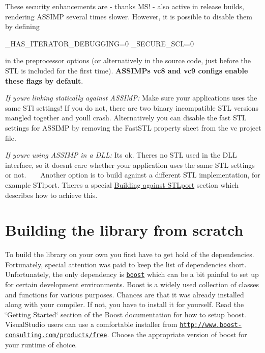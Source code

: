 These security enhancements are -\/ thanks M\+S! -\/ also active in release builds, rendering A\+S\+S\+I\+M\+P several times slower. However, it is possible to disable them by defining


\begin{DoxyCode}
\_HAS\_ITERATOR\_DEBUGGING=0
\_SECURE\_SCL=0
\end{DoxyCode}


in the preprocessor options (or alternatively in the source code, just before the S\+T\+L is included for the first time). {\bfseries A\+S\+S\+I\+M\+P\textquotesingle{}s vc8 and vc9 configs enable these flags by default}.

{\itshape If you\textquotesingle{}re linking statically against A\+S\+S\+I\+M\+P\+:} Make sure your applications uses the same S\+Tl settings! If you do not, there are two binary incompatible S\+T\+L versions mangled together and you\textquotesingle{}ll crash. Alternatively you can disable the fast S\+T\+L settings for A\+S\+S\+I\+M\+P by removing the \textquotesingle{}Fast\+S\+T\+L\textquotesingle{} property sheet from the vc project file.

{\itshape If you\textquotesingle{}re using A\+S\+S\+I\+M\+P in a D\+L\+L\+:} It\textquotesingle{}s ok. There\textquotesingle{}s no S\+T\+L used in the D\+L\+L interface, so it doesn\textquotesingle{}t care whether your application uses the same S\+T\+L settings or not. ~\newline
~\newline
 Another option is to build against a different S\+T\+L implementation, for example S\+Tlport. There\textquotesingle{}s a special \hyperlink{install_assimp_stlport}{Building against S\+T\+Lport} section which describes how to achieve this.\hypertarget{install_install_own}{}\section{Building the library from scratch}\label{install_install_own}
To build the library on your own you first have to get hold of the dependencies. Fortunately, special attention was paid to keep the list of dependencies short. Unfortunately, the only dependency is \href{http://www.boost.org}{\tt boost} which can be a bit painful to set up for certain development environments. Boost is a widely used collection of classes and functions for various purposes. Chances are that it was already installed along with your compiler. If not, you have to install it for yourself. Read the \char`\"{}\+Getting Started\char`\"{} section of the Boost documentation for how to setup boost. Visual\+Studio users can use a comfortable installer from \href{http://www.boost-consulting.com/products/free}{\tt http\+://www.\+boost-\/consulting.\+com/products/free}. Choose the appropriate version of boost for your runtime of choice.

